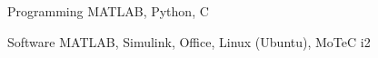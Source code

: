 
\begin{cvskills}
  \cvskill%
    {Programming}
    {MATLAB, Python, C}

  \cvskill%
    {Software}
    {MATLAB, Simulink, Office, Linux (Ubuntu), MoTeC i2}
\end{cvskills}

